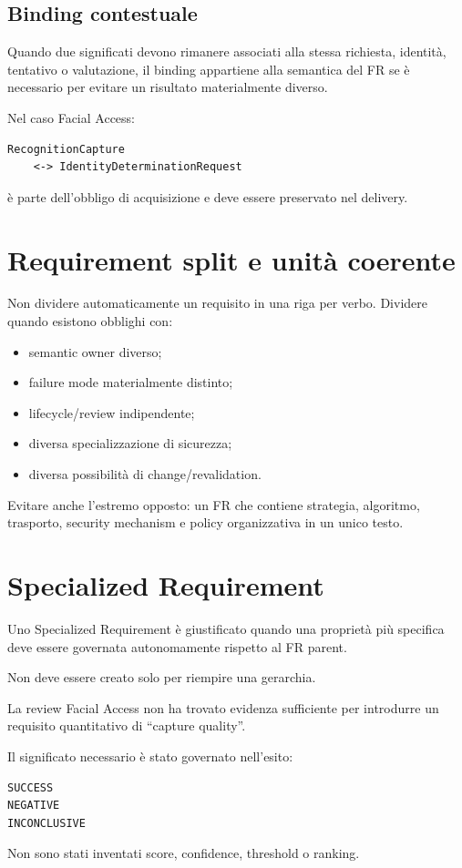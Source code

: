 \documentclass[11pt,a4paper]{article}
\begin{document}
\subsection{Binding contestuale}

Quando due significati devono rimanere associati alla stessa richiesta, identità, tentativo o valutazione, il binding appartiene alla semantica del FR se è necessario per evitare un risultato materialmente diverso.

Nel caso Facial Access:

\begin{lstlisting}
RecognitionCapture
    <-> IdentityDeterminationRequest
\end{lstlisting}

è parte dell'obbligo di acquisizione e deve essere preservato nel delivery.

\section{Requirement split e unità coerente}

Non dividere automaticamente un requisito in una riga per verbo. Dividere quando esistono obblighi con:

\begin{itemize}
\item semantic owner diverso;
\item failure mode materialmente distinto;
\item lifecycle/review indipendente;
\item diversa specializzazione di sicurezza;
\item diversa possibilità di change/revalidation.
\end{itemize}

Evitare anche l'estremo opposto: un FR che contiene strategia, algoritmo, trasporto, security mechanism e policy organizzativa in un unico testo.

\section{Specialized Requirement}

Uno Specialized Requirement è giustificato quando una proprietà più specifica deve essere governata autonomamente rispetto al FR parent.

Non deve essere creato solo per riempire una gerarchia.

\begin{examplebox}[DG-FA-002]
La review Facial Access non ha trovato evidenza sufficiente per introdurre un requisito quantitativo di ``capture quality''.

Il significato necessario è stato governato nell'esito:
\begin{lstlisting}
SUCCESS
NEGATIVE
INCONCLUSIVE
\end{lstlisting}

Non sono stati inventati score, confidence, threshold o ranking.
\end{examplebox}
\end{document}
